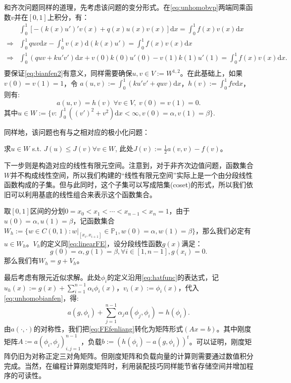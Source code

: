 \documentclass[lang=cn,10pt,newtx]{elegantbook}
\newcommand{\dif}{\mathrm{d}}
\begin{document}
和齐次问题同样的道理，先考虑该问题的变分形式。在\eqref{eq:unhomobvp}两端同乘函数$v$并在$[0,1]$上积分，有：
\begin{equation}
  \label{eq:bianfen2}
  \begin{aligned}
  &\int_{0}^{1}[-(k(x)u')'v(x)+q(x)u(x)v(x)]\dif x=\int_{0}^{1}f(x)v(x)\dif x\\
  \Rightarrow &\int_{0}^{1}quv\dif x-\int_{0}^{1}v(x)\dif(k(x)u')=\int_{0}^{1}f(x)v(x)\dif x\\
  \Rightarrow &\int_{0}^{1}(quv+ku'v')\dif x+v(0)k(0)u'(0)-v(1)k(1)u'(1)=\int_{0}^{1}f(x)v(x)\dif x.\\
  \end{aligned}
\end{equation}
要保证\eqref{eq:bianfen2}有意义，同样需要确保$u,v\in V:=W^{1,2}$。在此基础上，如果$v(0)=v(1)=1$，令
$a(u,v):=\int_{0}^{1}(ku'v'+quv)\dif x$，$h(v):=\int_{0}^{1}fv\dif x$，则有:
\begin{equation}
  \label{eq:unhomobianfen}
  a(u,v)=h(v)\;\forall v\in V,\; v(0)=v(1)=0.
\end{equation}
其中$u\in W:=\{v:\int_{0}^{1}((v')^{2}+v^2)\dif x<\infty, v(0)=\alpha, v(1)=\beta\}.$

同样地，该问题也有与之相对应的极小化问题：
\begin{example}
  \label{ex:optimal2}
  求$u\in W$ s.t. $J(u)\le J(v)\forall v\in W$, 此处$J(v):=\frac{1}{2}a(v,v)-f(v)$。
\end{example}

下一步则是构造对应的线性有限元空间。注意到，对于非齐次边值问题，函数集合$W$并不构成线性空间，所以我们构建的“线性有限元空间”实际上是一个由分段线性函数构成的子集。但与此同时，这个子集可以写成陪集(coset)的形式，所以我们依旧可以利用基底的线性组合来表示这个函数集合。

取$[0,1]$区间的分划$0=x_{0}<x_{1}<\cdots<x_{n-1}<x_{n}=1$，由于$u(0)=\alpha,u(1)=\beta$，记函数集合$W_{h}:=\{w\in C(0,1):w|_{[x_{i},x_{i+1}]}\in\mathbb{P}_{1},w(0)=\alpha,w(1)=\beta\}$，那么我们必定有$u\in W_{h}$。$V_{h}$的定义同\ref{eq:linearFE}，设分段线性函数$g(x)$满足：
\begin{equation}
  \label{eq:segmentlinearcondition}
  g(0)=\alpha,g(1)=\beta,\forall i\in[1,n-1],g(x_{i})=0.
\end{equation}
那么我们有$W_{h}=g+V_{h}$。

最后考虑有限元近似求解。此处$\phi_{i}$的定义沿用\eqref{eq:hatfunc}的表达式，记$u_{h}(x):=g(x)+\sum_{i=1}^{n-1}\alpha_{i}\phi_{i}(x)$，$v_{i}(x):=\phi_{i}(x)$，代入\eqref{eq:unhomobianfen}，得:
\begin{equation}
  \label{eq:FEfenliang}
  a(g,\phi_{i})+\sum_{j=1}^{n-1}\alpha_{j}a(\phi_{j},\phi_{i})=h(\phi_{i}).
\end{equation}
由$a(\cdot,\cdot)$的对称性，我们把\eqref{eq:FEfenliang}转化为矩阵形式$(Ax=b)$。其中刚度矩阵$A:=a(\phi_{i},\phi_{j})_{i,j=1}^{n-1}$，负载$b:=(h(\phi_{i})-a(g,\phi_{i}))^{t}$。可以证明，刚度矩阵仍旧为对称正定三对角矩阵。但刚度矩阵和负载向量的计算则需要通过数值积分完成。当然，在编程计算刚度矩阵时，利用装配技巧同样能节省存储空间并增加程序的可读性。
\end{document}
